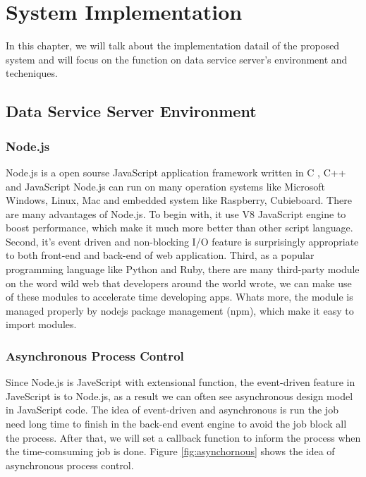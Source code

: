 \chapter{System Implementation}\label{cha:Implementation}
In this chapter, we will talk about the implementation datail of the proposed system and will focus on the function on data service server's environment and techeniques.

\section{Data Service Server Environment}

\subsection{Node.js}
Node.js \cite{nodejs} is a open sourse JavaScript application framework written in C \cite{clang}, C++ \cite{cplus} and JavaScript \cite{javascript}
Node.js can run on many operation systems like Microsoft Windows, Linux, Mac and embedded system like Raspberry, Cubieboard.
There are many advantages of Node.js.
To begin with, it use V8 JavaScript engine to boost performance, which make it much more better than other script language.
Second, it's event driven and non-blocking I/O feature is surprisingly appropriate to both front-end and back-end of web application.
Third, as a popular programming language like Python and Ruby, there are many third-party module on the word wild web that developers around the world wrote,
we can make use of these modules to accelerate time developing apps. Whats more, the module is managed properly by nodejs package management (npm), which make it easy to import modules.
\subsection{Asynchronous Process Control}
Since Node.js is JaveScript with extensional function, the event-driven feature in JaveScript is to Node.js, as a result we can often see asynchronous design model in JavaScript code.
The idea of event-driven and asynchronous is run the job need long time to finish in the back-end event engine to avoid the job block all the process.
After that, we will set a callback function to inform the process when the time-comsuming job is done.
Figure \ref{fig:asynchornous} shows the idea of asynchronous process control.

